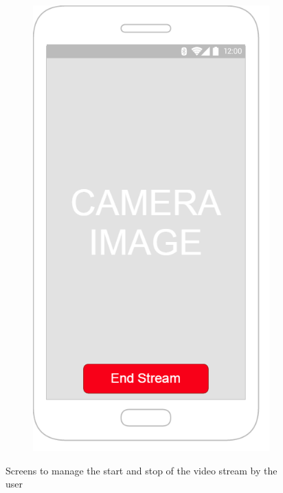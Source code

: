 \documentclass{article}
\begin{document}
\begin{figure}
        \begin{subfigure}[b]{0.5\textwidth}
                \includegraphics[width=\textwidth]{EmergencyAppIteration1/iteration1videocallEnd}
        \end{subfigure}
        Screens to manage the start and stop of the video stream by the user
\end{figure}
\end{document}
